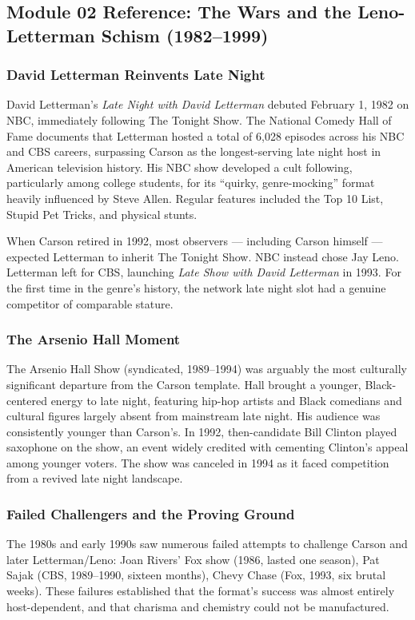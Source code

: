 \documentclass[11pt,letterpaper]{article}
\begin{document}
\subsection{Module 02 Reference: The Wars and the Leno-Letterman Schism (1982--1999)}

\subsubsection{David Letterman Reinvents Late Night}
David Letterman's \textit{Late Night with David Letterman} debuted February 1, 1982 on NBC, immediately following The Tonight Show. The National Comedy Hall of Fame documents that Letterman hosted a total of 6,028 episodes across his NBC and CBS careers, surpassing Carson as the longest-serving late night host in American television history. His NBC show developed a cult following, particularly among college students, for its ``quirky, genre-mocking'' format heavily influenced by Steve Allen. Regular features included the Top 10 List, Stupid Pet Tricks, and physical stunts.

When Carson retired in 1992, most observers --- including Carson himself --- expected Letterman to inherit The Tonight Show. NBC instead chose Jay Leno. Letterman left for CBS, launching \textit{Late Show with David Letterman} in 1993. For the first time in the genre's history, the network late night slot had a genuine competitor of comparable stature.

\subsubsection{The Arsenio Hall Moment}
The Arsenio Hall Show (syndicated, 1989--1994) was arguably the most culturally significant departure from the Carson template. Hall brought a younger, Black-centered energy to late night, featuring hip-hop artists and Black comedians and cultural figures largely absent from mainstream late night. His audience was consistently younger than Carson's. In 1992, then-candidate Bill Clinton played saxophone on the show, an event widely credited with cementing Clinton's appeal among younger voters. The show was canceled in 1994 as it faced competition from a revived late night landscape.

\subsubsection{Failed Challengers and the Proving Ground}
The 1980s and early 1990s saw numerous failed attempts to challenge Carson and later Letterman/Leno: Joan Rivers' Fox show (1986, lasted one season), Pat Sajak (CBS, 1989--1990, sixteen months), Chevy Chase (Fox, 1993, six brutal weeks). These failures established that the format's success was almost entirely host-dependent, and that charisma and chemistry could not be manufactured.
\end{document}
